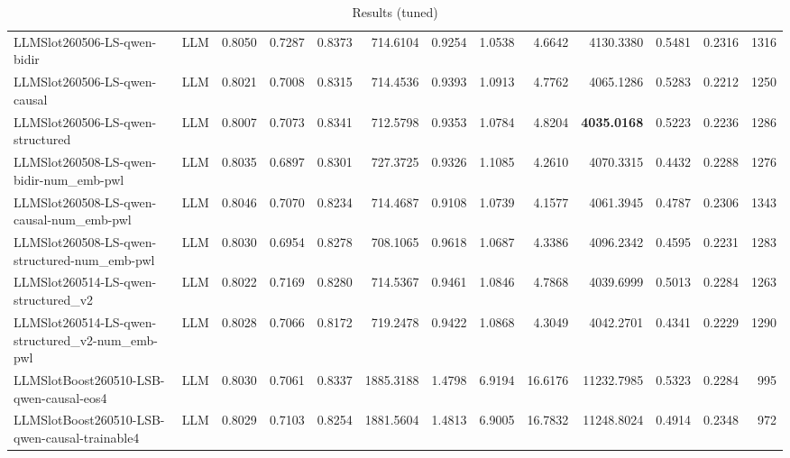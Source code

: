 \begin{table}[htbp]
{\begin{tabular}{ll|rrrrrrrrrr|r}
LLMSlot260506-LS-qwen-bidir & LLM & 0.8050 & 0.7287 & 0.8373 & 714.6104 & 0.9254 & 1.0538 & 4.6642 & 4130.3380 & 0.5481 & 0.2316 & 1316 \\
LLMSlot260506-LS-qwen-causal & LLM & 0.8021 & 0.7008 & 0.8315 & 714.4536 & 0.9393 & 1.0913 & 4.7762 & 4065.1286 & 0.5283 & 0.2212 & 1250 \\
LLMSlot260506-LS-qwen-structured & LLM & 0.8007 & 0.7073 & 0.8341 & 712.5798 & 0.9353 & 1.0784 & 4.8204 & \textbf{4035.0168} & 0.5223 & 0.2236 & 1286 \\
LLMSlot260508-LS-qwen-bidir-num\_emb-pwl & LLM & 0.8035 & 0.6897 & 0.8301 & 727.3725 & 0.9326 & 1.1085 & 4.2610 & 4070.3315 & 0.4432 & 0.2288 & 1276 \\
LLMSlot260508-LS-qwen-causal-num\_emb-pwl & LLM & 0.8046 & 0.7070 & 0.8234 & 714.4687 & 0.9108 & 1.0739 & 4.1577 & 4061.3945 & 0.4787 & 0.2306 & 1343 \\
LLMSlot260508-LS-qwen-structured-num\_emb-pwl & LLM & 0.8030 & 0.6954 & 0.8278 & 708.1065 & 0.9618 & 1.0687 & 4.3386 & 4096.2342 & 0.4595 & 0.2231 & 1283 \\
LLMSlot260514-LS-qwen-structured\_v2 & LLM & 0.8022 & 0.7169 & 0.8280 & 714.5367 & 0.9461 & 1.0846 & 4.7868 & 4039.6999 & 0.5013 & 0.2284 & 1263 \\
LLMSlot260514-LS-qwen-structured\_v2-num\_emb-pwl & LLM & 0.8028 & 0.7066 & 0.8172 & 719.2478 & 0.9422 & 1.0868 & 4.3049 & 4042.2701 & 0.4341 & 0.2229 & 1290 \\
LLMSlotBoost260510-LSB-qwen-causal-eos4 & LLM & 0.8030 & 0.7061 & 0.8337 & 1885.3188 & 1.4798 & 6.9194 & 16.6176 & 11232.7985 & 0.5323 & 0.2284 & 995 \\
LLMSlotBoost260510-LSB-qwen-causal-trainable4 & LLM & 0.8029 & 0.7103 & 0.8254 & 1881.5604 & 1.4813 & 6.9005 & 16.7832 & 11248.8024 & 0.4914 & 0.2348 & 972 \\
\bottomrule
\end{tabular}
}
\caption{Results (tuned)}
\label{tab:results_tuned}
\end{table}